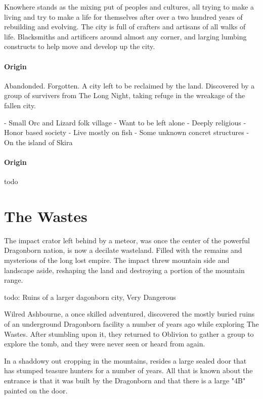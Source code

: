 \documentclass[letterpaper, twocolumn, openany, nodeprecatedcode, layout=true]{dndbook}
\begin{document}
Knowhere stands as the mixing put of peoples and cultures, all trying to make a living and
try to make a life for themselves after over a two hundred years of rebuilding and evolving.
The city is full of crafters and artisans of all walks of life. Blacksmiths and artificers
around almost any corner, and larging lumbing constructs to help move and develop up the
city.

\paragraph{Origin}

Abandonded. Forgotten. A city left to be reclaimed by the land. Discovered by a group of
survivers from The Long Night, taking refuge in the wreakage of the fallen city.

- Small Orc and Lizard folk village
- Want to be left alone
- Deeply religious
- Honor based society
- Live mostly on fish
- Some unknown concret structures
- On the island of Skira

\paragraph{Origin}

todo

\section{The Wastes}

The impact crator left behind by a meteor, was once the center of the powerful Dragonborn
nation, is now a decilate wasteland. Filled with the remains and mysterious of the long
lost empire. The impact threw mountain side and landscape aside, reshaping the land
and destroying a portion of the mountain range.

todo: Ruins of a larger dagonborn city, Very Dangerous


Wilred Ashbourne, a once skilled adventured, discovered the mostly buried ruins of an
underground Dragonborn facility a number of years ago while exploring The Wastes. After
stumbling upon it, they returned to Oblivion to gather a group to explore the tomb,
and they were never seen or heard from again.


In a shaddowy out cropping in the mountains, resides a large sealed door that has stumped
teasure hunters for a number of years. All that is known about the entrance is that it
was built by the Dragonborn and that there is a large "4B" painted on the door.
\end{document}
